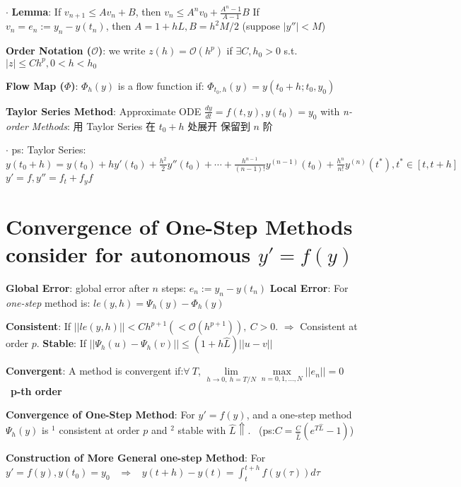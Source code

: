 \documentclass[9pt]{article}
\begin{document}
$\cdot$ \textbf{Lemma}: If $v_{n+1}\leq Av_n+B$, then $v_n\leq A^nv_0+\frac{A^n-1}{A-1}B$ \quad If $v_{n}=e_n:=y_n-y(t_n)$, then $A=1+hL,B=h^2M/2$ {\scriptsize (suppose $|y''|<M$)}

\textbf{Order Notation ($\mathcal{O}$)}: we write $z(h)=\mathcal{O}(h^p)$ if $\exists C,h_0>0$ s.t. $|z|\leq Ch^p,0<h<h_0$

\textbf{Flow Map ($\Phi$)}: {\small $\Phi_h(y)$ is a flow function if: $\Phi_{t_0,h}(y)=y(t_0+h;t_0,y_0)$} 

\textbf{Taylor Series Method}: {\small Approximate ODE $\frac{dy}{dt}=f(t,y),y(t_0)=y_0$ with \textit{n-order Methods}: 用 Taylor Series 在 $t_0+h$ 处展开 保留到 $n$ 阶}

$\cdot$ ps: {\footnotesize Taylor Series: $y(t_0+h)=y(t_0)+hy'(t_0)+\frac{h^2}{2}y''(t_0)+\cdots+\frac{h^{n-1}}{(n-1)!}y^{(n-1)}(t_0)+\frac{h^n}{n!}y^{(n)}(t^*),t^*\in[t,t+h]$ \quad $y'=f,y''=f_t+f_yf$}


\section{Convergence of One-Step Methods {\scriptsize consider for autonomous $y'=f(y)$}}

\textbf{Global Error}: global error after $n$ steps: $e_n:=y_n-y(t_n)$ \quad \textbf{Local Error}: {\small For \textit{one-step} method is: $le(y,h)=\Psi_h(y)-\Phi_h(y)$}

\textbf{Consistent}: {\small If $||le(y,h)||<Ch^{p+1} (<\mathcal{O}(h^{p+1})), \ C>0$. $\Rightarrow$ Consistent at order $p$.} \quad \textbf{Stable}: If $||\Psi_h(u)-\Psi_h(v)||\leq(1+h\widehat{L})||u-v||$

\textbf{Convergent}: {\small A method is convergent if:$\forall \ T$, $\lim\limits_{h\to0,\ h=T/N}\max\limits_{n=0,1,...,N}||e_n||=0$} \quad \quad {} \ {\tiny \textbf{p-th order}}

\vspace{-2pt}
\textbf{Convergence of One-Step Method}: {\small For $y'=f(y)$, and a one-step method $\Psi_h(y)$ is $^1$ consistent at order $p$ and $^2$ stable with $\widehat{L}\Uparrow$.} \ {\tiny (ps:$C=\frac{C}{\widehat{L}}(e^{T\widehat{L}}-1)$)}

\textbf{Construction of More General one-step Method}: For $y'=f(y),y(t_0)=y_0$ \ $\Rightarrow$ \ $y(t+h)-y(t)=\int^{t+h}_tf(y(\tau))d\tau$
\end{document}

